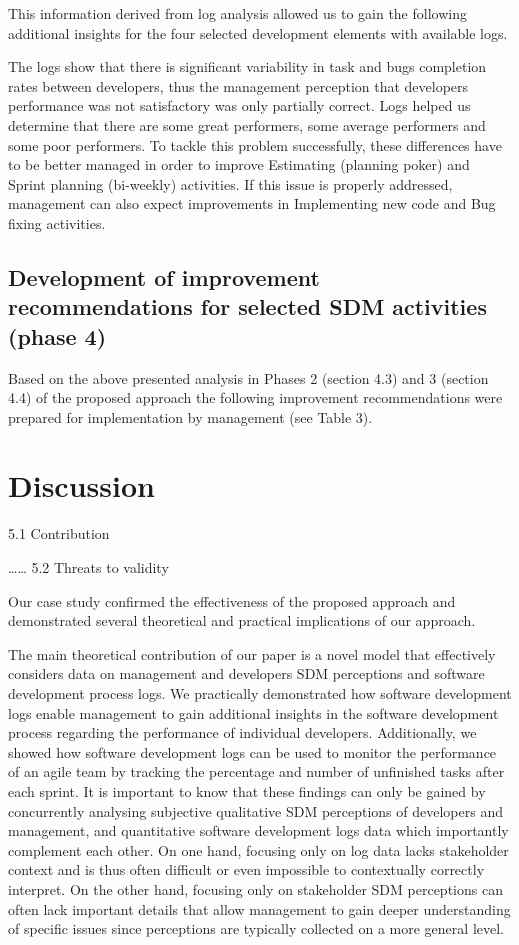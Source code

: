 This information derived from log analysis allowed us to gain the following additional insights for the four selected development elements with available logs.

The logs show that there is significant variability in task and bugs completion rates between developers, thus the management perception that developers performance was not satisfactory was only partially correct. Logs helped us determine that there are some great performers, some average performers and some poor performers.  To tackle this problem successfully, these differences have to be better managed in order to improve Estimating (planning poker) and Sprint planning (bi-weekly) activities. If this issue is properly addressed, management can also expect improvements in Implementing new code and Bug fixing activities.

\subsection{Development of improvement recommendations for selected SDM activities (phase 4)}
Based on the above presented analysis in Phases 2 (section 4.3) and 3 (section 4.4) of the proposed approach the following improvement recommendations were prepared for implementation by management (see Table 3). 




\section{Discussion}
5.1 Contribution 

……
5.2 Threats to validity

Our case study confirmed the effectiveness of the proposed approach and demonstrated several theoretical and practical implications of our approach. 

The main theoretical contribution of our paper is a novel model that effectively considers data on management and developers SDM perceptions and software development process logs. We practically demonstrated how software development logs enable management to gain additional insights in the software development process regarding the performance of individual developers. Additionally, we showed how software development logs can be used to monitor the performance of an agile team by tracking the percentage and number of unfinished tasks after each sprint. It is important to know that these findings can only be gained by concurrently analysing subjective qualitative SDM perceptions of developers and management, and quantitative software development logs data which importantly complement each other. On one hand, focusing only on log data lacks stakeholder context and is thus often difficult or even impossible to contextually correctly interpret. On the other hand, focusing only on stakeholder SDM perceptions can often lack important details that allow management to gain deeper understanding of specific issues since perceptions are typically collected on a more general level. 

